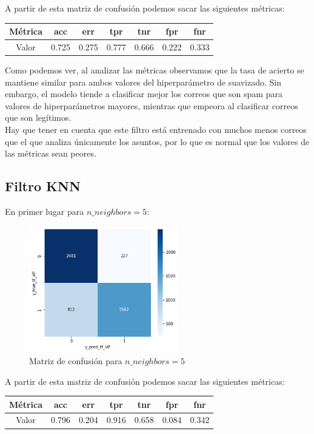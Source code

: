 \documentclass[conference,a4paper]{IEEEtran}
\begin{document}
A partir de esta matriz de confusión podemos sacar las siguientes métricas:

\begin{center}
\begin{tabular}[h]{ |c|c|c|c|c|c|c| } 
 \hline
 Métrica & acc & err & tpr & tnr & fpr & fnr \\ 
 \hline
 Valor & 0.725 & 0.275 & 0.777 & 0.666 & 0.222 & 0.333 \\ 
 \hline
\end{tabular}
\end{center}

Como podemos ver, al analizar las métricas observamos que la tasa de acierto se mantiene similar para ambos valores del hiperparámetro de suavizado. Sin embargo, el modelo tiende a clasificar mejor los correos que son spam para valores de hiperparámetros mayores, mientras que empeora al clasificar correos que son legítimos. \\

Hay que tener en cuenta que este filtro está entrenado con muchos menos correos que el que analiza únicamente los asuntos, por lo que es normal que los valores de las métricas sean peores.


\subsection{Filtro KNN}
En primer lugar para $n\_neighbors=5$: \\

\begin{figure}[h]
  \centering
  \includegraphics[width=65mm]{knn_5}
  \caption{Matriz de confusión para $n\_neighbors=5$}
  \label{fig:ejemplo}
\end{figure}

A partir de esta matriz de confusión podemos sacar las siguientes métricas:

\begin{center}
\begin{tabular}[bp!]{ |c|c|c|c|c|c|c| } 
 \hline
 Métrica & acc & err & tpr & tnr & fpr & fnr \\ 
 \hline
 Valor & 0.796 & 0.204 & 0.916 & 0.658 & 0.084 & 0.342 \\ 
 \hline
\end{tabular}
\end{center}
\end{document}
